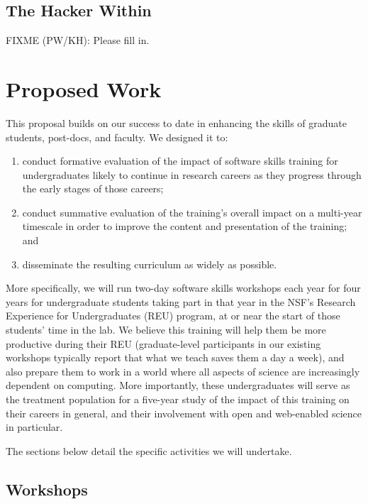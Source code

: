 \documentclass[11pt]{article}
\newcommand{\fixme}[2]{FIXME (#1): {#2}}
\begin{document}
\subsection{The Hacker Within}

\fixme{PW/KH}{Please fill in.}

\section{Proposed Work}

This proposal builds on our success to date in enhancing the skills of
graduate students, post-docs, and faculty.  We designed it to:

\begin{enumerate}

\item
  conduct formative evaluation of the impact of software skills
  training for undergraduates likely to continue in research careers
  as they progress through the early stages of those careers;

\item
  conduct summative evaluation of the training's overall impact on a
  multi-year timescale in order to improve the content and
  presentation of the training; and

\item
  disseminate the resulting curriculum as widely as possible.

\end{enumerate}

More specifically, we will run two-day software skills workshops each
year for four years for undergraduate students taking part in that
year in the NSF's Research Experience for Undergraduates (REU)
program, at or near the start of those students' time in the lab.  We
believe this training will help them be more productive during their
REU (graduate-level participants in our existing workshops typically
report that what we teach saves them a day a week), and also prepare
them to work in a world where all aspects of science are increasingly
dependent on computing.  More importantly, these undergraduates will
serve as the treatment population for a five-year study of the impact
of this training on their careers in general, and their involvement
with open and web-enabled science in particular.

The sections below detail the specific activities we will undertake.

\subsection{Workshops}
\end{document}

